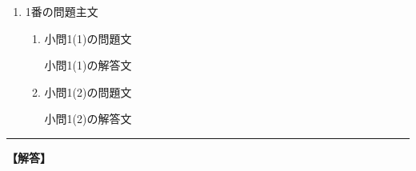\openKaiFile
    \begin{enumerate}[1.\ ]
    \item 1番の問題主文
        \begin{enumerate}[(1)]
            \item 小問1(1)の問題文
            \begin{Kaitou}
                小問1(1)の解答文
            \end{Kaitou}
            \item 小問1(2)の問題文
            \begin{Kaitou}
                小問1(2)の解答文
            \end{Kaitou}
        \end{enumerate}
    \end{enumerate}
\closeKaiFile
    \vfill
    \hrule
    \begin{center}\textbf{【解答】}\end{center}
    \small
{}
